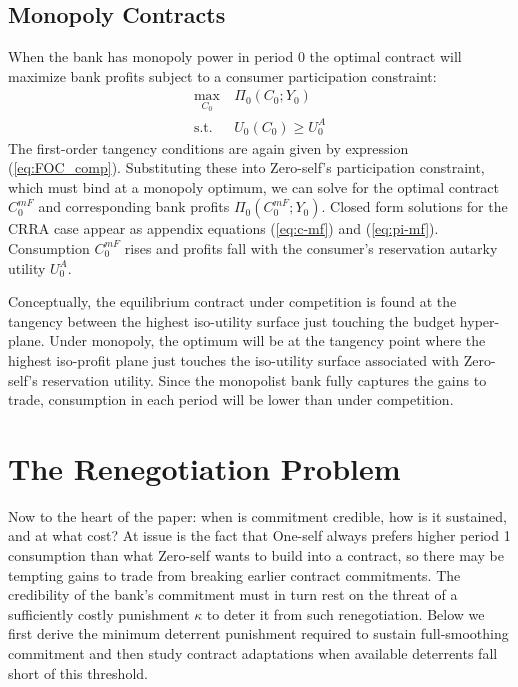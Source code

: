 \documentclass[11pt,english]{article}
\theoremstyle{plain}
\theoremstyle{definition}
\begin{document}
\subsection{Monopoly Contracts}

\label{sec:own}

When the bank has monopoly power in period 0 the optimal contract
will maximize bank profits subject to a consumer participation constraint:
\begin{align}
\max_{C_{0}} & \ \Pi_{0}\left(C_{0};Y_{0}\right)\label{eq:monop-obj}\\
\text{s.t.} & \ U_{0}\left(C_{0}\right)\geq U_{0}^{A}\label{eq:CPC0}
\end{align}
The first-order tangency conditions are again given by expression
(\ref{eq:FOC_comp}). Substituting these into Zero-self's participation
constraint, which must bind at a monopoly optimum, we can solve
for the optimal contract $C_{0}^{mF}$ and corresponding bank profits
$\Pi_{0}\left(C_{0}^{mF};Y_{0}\right)$. Closed form solutions for
the CRRA case appear as appendix equations (\ref{eq:c-mf}) and (\ref{eq:pi-mf}).
Consumption $C_{0}^{mF}$ rises and profits fall with the consumer's
reservation autarky utility $U_{0}^{A}$.

Conceptually, the equilibrium contract under competition is found
at the tangency between the highest iso-utility surface just touching
the budget hyper-plane. Under monopoly, the optimum will
be at the tangency point where the highest iso-profit plane just touches
the iso-utility surface associated with Zero-self's reservation utility.
Since the monopolist bank fully captures the gains to trade, consumption
in each period will be lower than under competition. 

\section{The Renegotiation Problem}

\label{renegotiation}

Now to  the heart of the paper: when is commitment credible,
how is it sustained, and at what cost? At issue is the fact that One-self
always prefers higher period 1 consumption than what Zero-self wants
to build into a contract, so there may be tempting gains to trade
from breaking earlier contract commitments. The credibility of the
bank's commitment must in turn rest on the threat of a sufficiently
costly punishment $\kappa$ to deter it from such renegotiation.
Below we first derive the minimum deterrent punishment required to
sustain full-smoothing commitment and then study contract adaptations when available deterrents fall short of this threshold.
\end{document}
